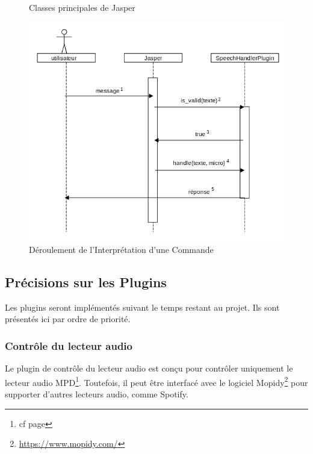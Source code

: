 \documentclass[12pt]{article}
\begin{document}
		\begin{figure}
			\centering
			\caption{\label{classes} Classes principales de Jasper}
		\end{figure}
	
		\begin{figure}
			\centering
				\includegraphics[width=\textwidth]{sequence}
				\caption{\label{séquence} Déroulement de l'Interprétation d'une Commande}
		\end{figure}

		\subsection{Précisions sur les Plugins}
		Les plugins seront implémentés suivant le temps restant au projet. Ils sont présentés ici par ordre de priorité.
		
		\subsubsection{Contrôle du lecteur audio}
		Le plugin de contrôle du lecteur audio est conçu pour contrôler uniquement le lecteur audio MPD\footnote{cf page \pageref{mpd}}. Toutefois, il peut être interfacé avec le logiciel Mopidy\footnote{\url{https://www.mopidy.com/}} pour supporter d'autres lecteurs audio, comme Spotify.
		
\end{document}
